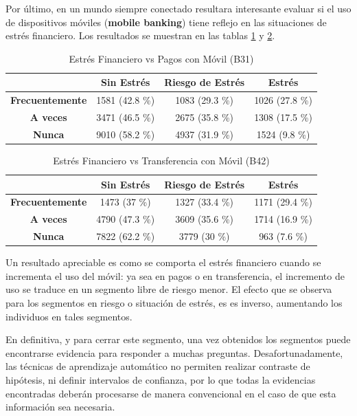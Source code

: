 \documentclass[a4paper, 11pt]{article}
\begin{document}
Por último, en un mundo siempre conectado resultara interesante evaluar si el 
uso de dispositivos móviles (\textbf{mobile banking}) tiene reflejo en las
situaciones de estrés financiero. Los resultados se muestran en las tablas 
\ref{tab:stress_vs_mobile_payment} y \ref{tab:stress_vs_mobile_transfer}.

\begin{table}[ht]
\centering
\begin{tabular}{cccc}
\toprule
 & \textbf{Sin Estrés} & \textbf{Riesgo de Estrés} & \textbf{Estrés}\\
\midrule
\textbf{Frecuentemente} & 1581 (42.8 \%) &	1083 (29.3 \%) &	1026 (27.8 \%)\\
\textbf{A veces} & 3471 (46.5 \%) &	2675 (35.8 \%) &	1308 (17.5 \%)\\
\textbf{Nunca} & 9010 (58.2 \%) &	4937 (31.9 \%) &	1524 (9.8 \%)\\
\bottomrule
\end{tabular}
\caption{Estrés Financiero vs Pagos con Móvil (B31)}
\label{tab:stress_vs_mobile_payment}
\end{table}

\begin{table}[ht]
\centering
\begin{tabular}{cccc}
\toprule
 & \textbf{Sin Estrés} & \textbf{Riesgo de Estrés} & \textbf{Estrés}\\
\midrule
\textbf{Frecuentemente} & 1473 (37 \%) &	1327 (33.4 \%) &	1171 (29.4 \%)\\
\textbf{A veces} & 4790 (47.3 \%) &	3609 (35.6 \%) &	1714 (16.9 \%)\\
\textbf{Nunca} & 7822 (62.2 \%) &	3779 (30 \%) &	963 (7.6 \%)\\
\bottomrule
\end{tabular}
\caption{Estrés Financiero vs Transferencia con Móvil (B42)}
\label{tab:stress_vs_mobile_transfer}
\end{table}

Un resultado apreciable es como se comporta el estrés financiero cuando se
incrementa el uso del móvil: ya sea en pagos o en transferencia, el
incremento de uso se traduce en un segmento libre de riesgo menor. El efecto
que se observa para los segmentos en riesgo o situación de estrés, es es
inverso, aumentando los individuos en tales segmentos.

En definitiva, y para cerrar este segmento, una vez obtenidos los segmentos 
puede encontrarse evidencia para responder a muchas preguntas. Desafortunadamente,
las técnicas de aprendizaje automático no permiten realizar contraste de 
hipótesis, ni definir intervalos de confianza, por lo que todas la evidencias 
encontradas deberán procesarse de manera convencional en el caso de que esta
información sea necesaria.
\end{document}
